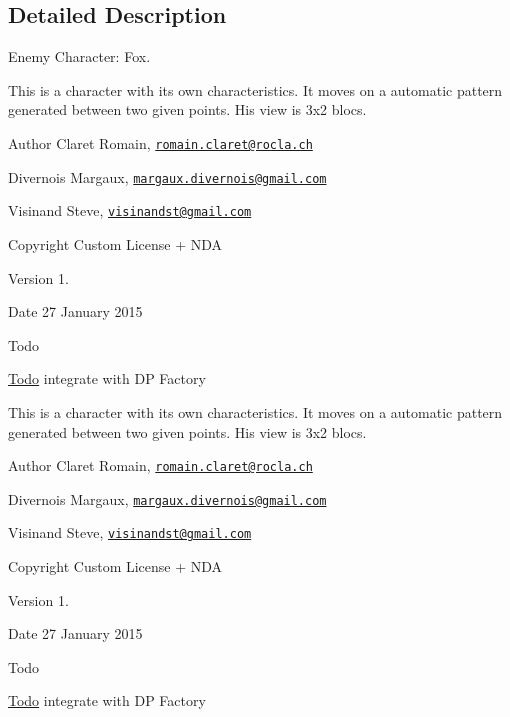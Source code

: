 \subsection{Detailed Description}
Enemy Character\+: Fox. 

This is a character with its own characteristics. It moves on a automatic pattern generated between two given points. His view is 3x2 blocs. \begin{DoxyAuthor}{Author}
Claret Romain, \href{mailto:romain.claret@rocla.ch}{\tt romain.\+claret@rocla.\+ch} 

Divernois Margaux, \href{mailto:margaux.divernois@gmail.com}{\tt margaux.\+divernois@gmail.\+com} 

Visinand Steve, \href{mailto:visinandst@gmail.com}{\tt visinandst@gmail.\+com} 
\end{DoxyAuthor}
\begin{DoxyCopyright}{Copyright}
Custom License + N\+D\+A 
\end{DoxyCopyright}
\begin{DoxyVersion}{Version}
1. 
\end{DoxyVersion}
\begin{DoxyDate}{Date}
27 January 2015 
\end{DoxyDate}
\begin{DoxyRefDesc}{Todo}
\item[\hyperlink{todo__todo000005}{Todo}]integrate with D\+P Factory \end{DoxyRefDesc}


This is a character with its own characteristics. It moves on a automatic pattern generated between two given points. His view is 3x2 blocs. \begin{DoxyAuthor}{Author}
Claret Romain, \href{mailto:romain.claret@rocla.ch}{\tt romain.\+claret@rocla.\+ch} 

Divernois Margaux, \href{mailto:margaux.divernois@gmail.com}{\tt margaux.\+divernois@gmail.\+com} 

Visinand Steve, \href{mailto:visinandst@gmail.com}{\tt visinandst@gmail.\+com} 
\end{DoxyAuthor}
\begin{DoxyCopyright}{Copyright}
Custom License + N\+D\+A 
\end{DoxyCopyright}
\begin{DoxyVersion}{Version}
1. 
\end{DoxyVersion}
\begin{DoxyDate}{Date}
27 January 2015 
\end{DoxyDate}
\begin{DoxyRefDesc}{Todo}
\item[\hyperlink{todo__todo000016}{Todo}]integrate with D\+P Factory \end{DoxyRefDesc}


